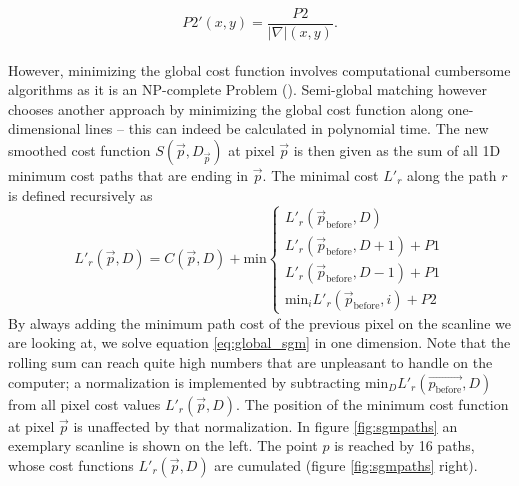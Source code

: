 \documentclass  [
  paper    = a4,
  BCOR     = 10mm,
  twoside,
  fontsize = 12pt,
  fleqn,
  toc      = bibnumbered,
  toc      = listofnumbered,
  numbers  = noendperiod,
  headings = normal,
  listof   = leveldown,
  version  = 3.03
]                                       {scrreprt}
\begin{document}
\begin{equation}\label{eq:stereosgm_p2}
P2'(x,y) = \frac{P2}{|\nabla|(x,y)}.
\end{equation}\\ However, minimizing the global cost function involves computational cumbersome algorithms as it is an NP-complete Problem (\cite{hirschmuller2011semi}). Semi-global matching however chooses another approach by minimizing the global cost function along one-dimensional lines -- this can indeed be calculated in polynomial time.
The new smoothed cost function $S(\vec p , D_{\vec p})$ at pixel $\vec{p}$ is then given as the sum of all 1D minimum cost paths that are ending in $\vec{p}$.  The minimal cost $L'_r$ along the path $r$ is defined recursively as
\begin{equation}\label{eq:local_sgm}
L'_r(\vec{p}, D) = C(\vec{p}, D) + \text {min}
\begin{cases}
	L'_r(\vec{p}_\text{before}, D) \\
	L'_r(\vec{p}_\text{before}, D+1)+P1 \\
	L'_r(\vec{p}_\text{before}, D-1)+P1 \\
	\text{min}_i L'_r(\vec{p}_\text{before}, i)+P2 
\end{cases}
\end{equation} 
By always adding the minimum path cost of the previous pixel on the scanline we are looking at, we solve equation \ref{eq:global_sgm} in one dimension. Note that the rolling sum can reach quite high numbers that are unpleasant to handle on the computer; a normalization is implemented by subtracting min$_D L'_r(\vec{p_\text{before}}, D)$ from all pixel cost values $L'_r(\vec{p}, D)$. The position of the minimum cost function at pixel $\vec p$ is unaffected by that normalization. In figure \ref{fig:sgmpaths} an exemplary scanline is shown on the left.  The point $p$ is reached by 16 paths, whose cost functions $L'_r(\vec{p}, D)$ are cumulated (figure \ref{fig:sgmpaths} right).
\end{document}
